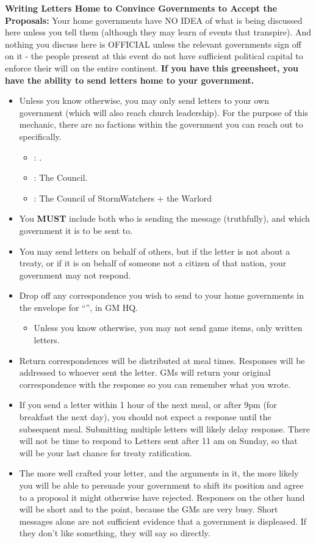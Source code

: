 \documentclass[green]{GL2020}
\begin{document}
\textbf{Writing Letters Home to Convince Governments to Accept the Proposals:}
Your home governments have NO IDEA of what is being discussed here unless you tell them (although they may learn of events that transpire). And nothing you discuss here is OFFICIAL unless the relevant governments sign off on it - the people present at this event do not have sufficient political capital to enforce their will on the entire continent. \textbf{If you have this greensheet, you have the ability to send letters home to your government.}
\begin{itemize}
  \item Unless you know otherwise, you may only send letters to your own government (which will also reach church leadership). For the purpose of this mechanic, there are no factions within the government you can reach out to specifically.
  \begin{itemize}
    \item \pFarm{}: \cQueen{\full}.
    \item \pTech{}: The Council.
    \item \pShip{}: The Council of StormWatchers + the Warlord
  \end{itemize}
  \item You \textbf{MUST} include both who is sending the message (truthfully), and which government it is to be sent to.
  \item You may send letters on behalf of others, but if the letter is not about a treaty, or if it is on behalf of someone not a citizen of that nation, your government may not respond.
  \item Drop off any correspondence you wish to send to your home governments in the envelope for “\sSignT{}”, in GM HQ.
  \begin{itemize}
    \item Unless you know otherwise, you may not send game items, only written letters.
  \end{itemize}
  \item Return correspondences will be distributed at meal times. Responses will be addressed to whoever sent the letter. GMs will return your original correspondence with the response so you can remember what you wrote.
  \item If you send a letter within 1 hour of the next meal, or after 9pm (for breakfast the next day), you should not expect a response until the subsequent meal. Submitting multiple letters will likely delay response. There will not be time to respond to Letters sent after 11 am on Sunday, so that will be your last chance for treaty ratification.
  \item The more well crafted your letter, and the arguments in it, the more likely you will be able to persuade your government to shift its position and agree to a proposal it might otherwise have rejected. Responses on the other hand will be short and to the point, because the GMs are very busy. Short messages alone are not sufficient evidence that a government is displeased. If they don’t like something, they will say so directly.
\end{itemize}
\end{document}
